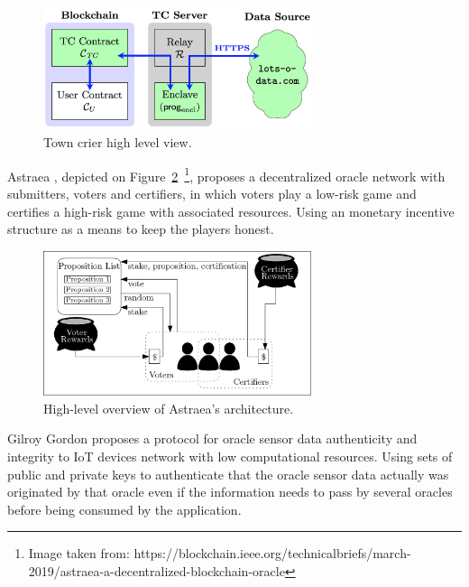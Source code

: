 \begin{figure}[H]
  \begin{center}
    \leavevmode
    \includegraphics[width=0.7\textwidth]{figures/town-crier.png}
    \caption{Town crier high level view.}
    \label{fig:/figures/town-crier}
  \end{center}
\end{figure}


Astraea \citet{Adler2018}, depicted on Figure~\ref{fig:/figures/astraea}~\footnote{Image taken from: https://blockchain.ieee.org/technicalbriefs/march-2019/astraea-a-decentralized-blockchain-oracle}, proposes a decentralized oracle network with submitters, voters and certifiers, in which voters play a low-risk game and certifies a high-risk game with associated resources. Using an monetary incentive structure as a means to keep the players honest.

\begin{figure}[H]
  \begin{center}
    \leavevmode
    \includegraphics[width=0.7\textwidth]{figures/astraea.jpg}
    \caption{High-level overview of Astraea's architecture.}
    \label{fig:/figures/astraea}
  \end{center}
\end{figure}

Gilroy Gordon \citet{Gordon2017} proposes a protocol for oracle sensor data authenticity and integrity to IoT devices network with low computational resources. Using sets of public and private keys to authenticate that the oracle sensor data actually was originated by that oracle even if the information needs to pass by several oracles before being consumed by the application.

